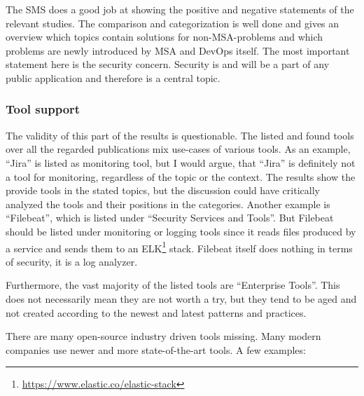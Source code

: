 The SMS does a good job at showing the positive and negative
statements of the relevant studies. The comparison and categorization
is well done and gives an overview which topics contain solutions
for non-MSA-problems and which problems are newly introduced by
MSA and DevOps itself. The most important statement here is the security
concern. Security is and will be a part of any public application
and therefore is a central topic.

\subsubsection{Tool support}

The validity of this part of the results is questionable.
The listed and found tools over all the regarded publications mix
use-cases of various tools. As an example, ``Jira'' is listed
as monitoring tool, but I would argue, that ``Jira'' is definitely
not a tool for monitoring, regardless of the topic or the context.
The results show the provide tools in the stated topics, but the
discussion could have critically analyzed the tools and their positions
in the categories. Another example is ``Filebeat'', which is listed under
``Security Services and Tools''. But Filebeat should be listed under
monitoring or logging tools since it reads files produced by a service
and sends them to an ELK\footnote{\url{https://www.elastic.co/elastic-stack}} stack.
Filebeat itself does nothing in terms of security, it is a log analyzer.

Furthermore, the vast majority of the listed tools are ``Enterprise Tools''.
This does not necessarily mean they are not worth a try,
but they tend to be aged and not created according to the
newest and latest patterns and practices.

There are many open-source industry driven tools missing. Many
modern companies use newer and more state-of-the-art tools.
A few examples:

